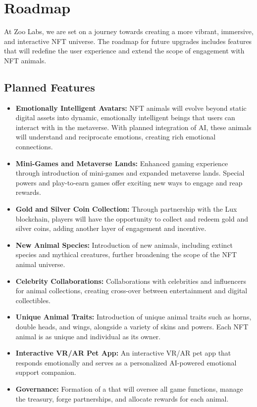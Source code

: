 \section{Roadmap}

At Zoo Labs, we are set on a journey towards creating a more vibrant, immersive, and interactive NFT universe. The roadmap for future upgrades includes features that will redefine the user experience and extend the scope of engagement with NFT animals.

\subsection{Planned Features}

\begin{itemize}[nosep]
\item \textbf{Emotionally Intelligent Avatars:} NFT animals will evolve beyond static digital assets into dynamic, emotionally intelligent beings that users can interact with in the metaverse. With planned integration of AI, these animals will understand and reciprocate emotions, creating rich emotional connections.

\item \textbf{Mini-Games and Metaverse Lands:} Enhanced gaming experience through introduction of mini-games and expanded metaverse lands. Special powers and play-to-earn games offer exciting new ways to engage and reap rewards.

\item \textbf{Gold and Silver Coin Collection:} Through partnership with the Lux blockchain, players will have the opportunity to collect and redeem gold and silver coins, adding another layer of engagement and incentive.

\item \textbf{New Animal Species:} Introduction of new animals, including extinct species and mythical creatures, further broadening the scope of the NFT animal universe.

\item \textbf{Celebrity Collaborations:} Collaborations with celebrities and influencers for animal collections, creating cross-over between entertainment and digital collectibles.

\item \textbf{Unique Animal Traits:} Introduction of unique animal traits such as horns, double heads, and wings, alongside a variety of skins and powers. Each NFT animal is as unique and individual as its owner.

\item \textbf{Interactive VR/AR Pet App:} An interactive VR/AR pet app that responds emotionally and serves as a personalized AI-powered emotional support companion.

\item \textbf{\DAO{} Governance:} Formation of a \DAO{} that will oversee all game functions, manage the treasury, forge partnerships, and allocate rewards for each animal.
\end{itemize}

